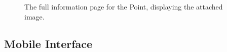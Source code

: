 \documentclass{article}
\begin{document}
		\begin{figure}[H]
			\centering
			\caption{The full information page for the Point, displaying the attached image.}
			\label{fig:eval-cb-4}
		\end{figure}

		\subsection{Mobile Interface}
\end{document}
